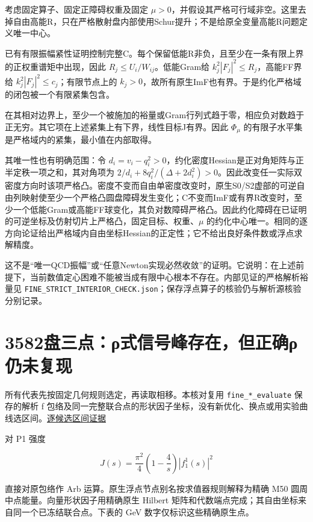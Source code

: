 \documentclass[
  10pt,
  a4paper,
]{article}
\begin{document}
考虑固定算子、固定正障碍权重及固定
\(\mu>0\)，并假设其严格可行域非空。这里去掉自由高能R，只在严格散射盘内部使用Schur提升；不是给原全变量高能R问题定义唯一中心。

已有有限振幅紧性证明控制完整C。每个保留低能R非负，且至少在一条有限上界的正权重谱矩中出现，因此
\(R_j\le U_i/W_{ij}\)。低能Gram给 \(k_j^2|F_j|^2\le R_j\)，高能FF界给
\(k_j^2|F_j|^2\le c_j\)；有限节点上的
\(k_j>0\)，故所有原生ImF也有界。于是约化严格域的闭包被一个有限紧集包含。

在其相对边界上，至少一个被施加的裕量或Gram行列式趋于零，相应负对数趋于正无穷。其它项在上述紧集上有下界，线性目标J有界。因此
\(\Phi_\mu\) 的有限子水平集是严格域内的紧集，最小值在内部取得。

其唯一性也有明确范围：令
\(d_i=v_i-q_i^2>0\)，约化密度Hessian是正对角矩阵与正半定秩一项之和，其对角项为
\(2/d_i+8q_i^2/(\Delta+2d_i^2)>0\)。因此改变任一实际双密度方向时该项严格凸。密度不变而自由单密度改变时，原生S0/S2虚部的可逆自由列映射使至少一个严格凸圆盘障碍发生变化；C不变而ImF或有界R改变时，至少一个低能Gram或高能FF球变化，其负对数障碍严格凸。因此约化障碍在已证明的可逆坐标及仿射切片上严格凸，固定目标、权重、\(\mu\)
的约化中心唯一。相同的逐方向论证给出严格域内自由坐标Hessian的正定性；它不给出良好条件数或浮点求解精度。

这不是``唯一QCD振幅''或``任意Newton实现必然收敛''的证明。它说明：在上述前提下，当前数值定心困难不能被当成有限中心根本不存在。内部见证的严格解析裕量见
\texttt{FINE\_STRICT\_INTERIOR\_CHECK.json}；保存浮点算子的核验仍与解析源核验分别记录。

\newpage

\section{3582盘三点：ρ式信号峰存在，但正确ρ仍未复现}\label{ux76d8ux4e09ux70b9ux3c1ux5f0fux4fe1ux53f7ux5cf0ux5b58ux5728ux4f46ux6b63ux786eux3c1ux4ecdux672aux590dux73b0}

所有代表先按固定几何规则选定，再读取相移。本核对复用
\texttt{fine\_*\_evaluate} 保存的解析 f
包络及同一完整联合点的形状因子坐标，没有新优化、换点或用实验曲线选区间。\href{../FINE_SIGNAL_PEAK_EXISTENCE.json}{逐候选区间证据}

对 P1 强度

\[
J(s)=\frac{\pi^2}{4}\left(1-\frac4s\right)|f^1_1(s)|^2
\]

直接对原包络作 Arb 运算。原生浮点节点别名按求值器规则解释为精确 M50
圆周中点能量。向量形状因子用精确原生 Hilbert
矩阵和代数端点完成；其自由坐标来自同一个已冻结联合点。下表的 GeV
数字仅标识这些精确原生点。
\end{document}
